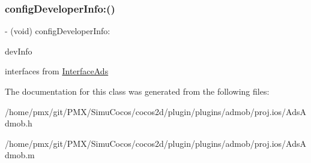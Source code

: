 \subsubsection{\texorpdfstring{config\+Developer\+Info\+:()}{configDeveloperInfo:()}}
{\footnotesize\ttfamily -\/ (void) config\+Developer\+Info\+: \begin{DoxyParamCaption}\item[{(N\+S\+Mutable\+Dictionary$\ast$)}]{dev\+Info }\end{DoxyParamCaption}}

interfaces from \hyperlink{classInterfaceAds-p}{Interface\+Ads} 

The documentation for this class was generated from the following files\+:\begin{DoxyCompactItemize}
\item 
/home/pmx/git/\+P\+M\+X/\+Simu\+Cocos/cocos2d/plugin/plugins/admob/proj.\+ios/Ads\+Admob.\+h\item 
/home/pmx/git/\+P\+M\+X/\+Simu\+Cocos/cocos2d/plugin/plugins/admob/proj.\+ios/Ads\+Admob.\+m\end{DoxyCompactItemize}
